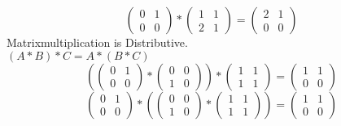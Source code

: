 \documentclass{article}
\begin{document}
		\begin{equation*}
	  	\begin{pmatrix} %
	  		0 & 1 \\	%
	  		0 & 0
	  	\end{pmatrix} 
  		*
  		\begin{pmatrix} %
  			1 & 1 \\	%
  			2 & 1
  		\end{pmatrix} 
  		=
  		\begin{pmatrix} %
  			2 & 1 \\	%
  			0 & 0
  		\end{pmatrix} 
	\end{equation*}
	Matrixmultiplication is Distributive.\\
		
		
	$(A*B)*C = A*(B*C)$
	\begin{equation*} 
		(
		\begin{pmatrix} %
			0 & 1 \\	%
			0 & 0
		\end{pmatrix} 
		*
		\begin{pmatrix} %
			0 & 0 \\	%
			1 & 0
		\end{pmatrix}
		) *
		\begin{pmatrix} %
			1 & 1 \\	%
			1 & 1
		\end{pmatrix}
		=
		\begin{pmatrix} %
			1 & 1 \\	%
			0 & 0
		\end{pmatrix}	
	\end{equation*}
	\begin{equation*} 	
		\begin{pmatrix} %
			0 & 1 \\	%
			0 & 0
		\end{pmatrix} 
		* (
		\begin{pmatrix} %
			0 & 0 \\	%
			1 & 0
		\end{pmatrix}
		 *
		\begin{pmatrix} %
			1 & 1 \\	%
			1 & 1
		\end{pmatrix}
		) =
		\begin{pmatrix} %
			1 & 1 \\	%
			0 & 0
		\end{pmatrix}	
	\end{equation*}
\end{document}
